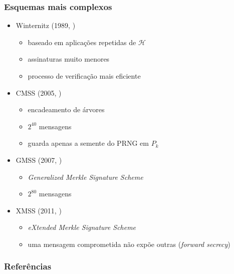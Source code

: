 \documentclass{beamer}
\begin{document}
\begin{frame}
  \frametitle{Esquemas mais complexos}
  \begin{itemize}
      \item Winternitz (1989, \cite{Dods2005})
    \begin{itemize}
      \item baseado em aplicações repetidas de $\mathcal{H}$
      \item assinaturas muito menores
      \item processo de verificação mais eficiente
    \end{itemize}
    \item CMSS (2005, \cite{Buchmann2006})
    \begin{itemize}
      \item encadeamento de árvores
      \item $2^{40}$ mensagens
      \item guarda apenas a semente do PRNG em $P_{k}$
    \end{itemize}
    \item GMSS (2007, \cite{Buchmann2007})
    \begin{itemize}
      \item \emph{Generalized Merkle Signature Scheme}
      \item $2^{80}$ mensagens
    \end{itemize}
    \item XMSS (2011, \cite{Buchmann2011})
    \begin{itemize}
      \item \emph{eXtended Merkle Signature Scheme}
      \item uma mensagem comprometida não expõe outras (\emph{forward secrecy})
    \end{itemize}
  \end{itemize}
\end{frame}

\begin{frame}[allowframebreaks]
  \frametitle{Referências}
  
  
\end{frame}
\end{document}

